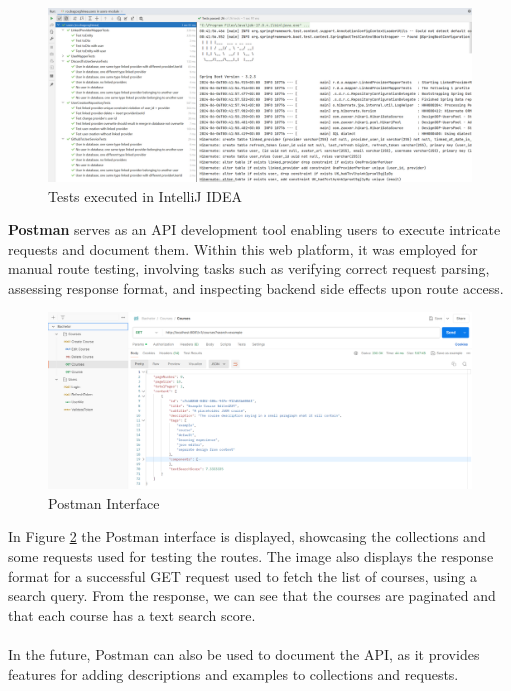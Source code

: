 \begin{figure}[h]
    \centering
    \includegraphics[trim={0 0 17cm 0},clip, width=\textwidth]{images/intellij-tests.png}
    \caption{Tests executed in IntelliJ IDEA}
    \label{fig:intellij-tests}
\end{figure}

\noindent \textbf{Postman} \cite{postman} serves as an API development tool enabling users to execute intricate requests and document them. Within this web platform, it was employed for manual route testing, involving tasks such as verifying correct request parsing, assessing response format, and inspecting backend side effects upon route access.

\begin{figure}[h]
    \centering
    \includegraphics[trim={0 0 20cm 0},clip, width=\textwidth]{images/postman.png}
    \caption{Postman Interface}
    \label{fig:postman}
\end{figure}

\noindent In Figure \ref{fig:postman} the Postman interface is displayed, showcasing the collections and some requests used for testing the routes. The image also displays the response format for a successful GET request used to fetch the list of courses, using a search query. From the response, we can see that the courses are paginated and that each course has a text search score.
\\\\
\noindent In the future, Postman can also be used to document the API, as it provides features for adding descriptions and examples to collections and requests.